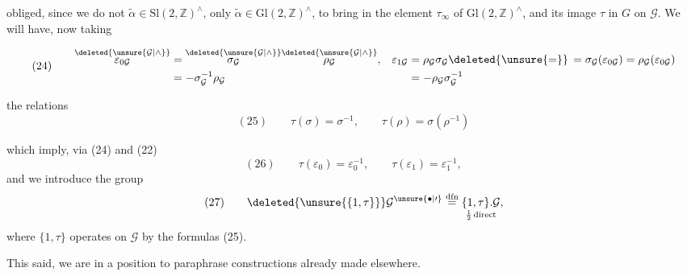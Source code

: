 

obliged, since  we do not
$\widetilde{\alpha}\in\mathrm{Sl}(2,\mathbb Z)^\wedge$,
only $\widetilde{\alpha}\in\mathrm{Gl}(2,\mathbb Z)^\wedge$,
to bring in the element $\tau_\infty$ of
$\mathrm{Gl}(2,\mathbb Z)^\wedge$,
and  its image $\tau$ in $G$ on
$\mathcal{G}$. We will have, now taking

\[
(24)\qquad
\begin{aligned}
\overset{\deleted{\unsure{\mathcal{G}|\wedge}}}{\varepsilon_{0\mathcal{G}}}
&=\overset{\deleted{\unsure{\mathcal{G}|\wedge}}}{\sigma_{\mathcal{G}}}
\overset{\deleted{\unsure{\mathcal{G}|\wedge}}}{\rho_{\mathcal{G}}},
&\varepsilon_{1\mathcal{G}}&=\rho_{\mathcal{G}}\sigma_{\mathcal{G}}
\deleted{\unsure{=}}\,=\sigma_{\mathcal{G}}(\varepsilon_{0\mathcal{G}})
=\rho_{\mathcal{G}}(\varepsilon_{0\mathcal{G}})\\
&=-\sigma_{\mathcal{G}}^{-1}\rho_{\mathcal{G}}
&&=-\rho_{\mathcal{G}}\sigma_{\mathcal{G}}^{-1}
\end{aligned}
\]


the relations
\[
(25)\qquad
\tau(\sigma)=\sigma^{-1},\qquad
\tau(\rho)=\sigma(\rho^{-1})
\]


which imply, via (24) and (22)
\[
(26)\qquad
\tau(\varepsilon_0)=\varepsilon_0^{-1},\qquad
\tau(\varepsilon_1)=\varepsilon_1^{-1},
\]
and we introduce the group
\[
(27)\qquad
\deleted{\unsure{\{1,\tau\}}}
\mathcal{G}^{\unsure{\bullet|\prime}}
\overset{\mathrm{dfn}}{=}
\underset{\frac12\,\text{direct}}{\{1,\tau\}.\mathcal{G}},
\]
where $\{1,\tau\}$ operates on $\mathcal{G}$ by the formulas (25).

This said, we are in a position to paraphrase constructions
already made elsewhere.

